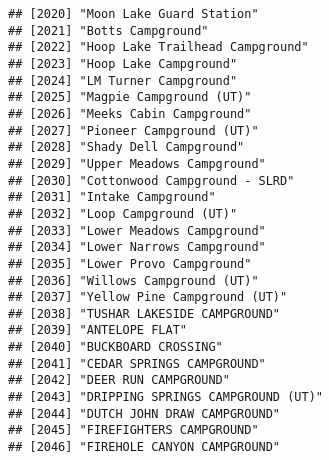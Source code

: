 \documentclass[
]{article}
\begin{document}
\begin{verbatim}
## [2020] "Moon Lake Guard Station"                                                             
## [2021] "Botts Campground"                                                                    
## [2022] "Hoop Lake Trailhead Campground"                                                      
## [2023] "Hoop Lake Campground"                                                                
## [2024] "LM Turner Campground"                                                                
## [2025] "Magpie Campground (UT)"                                                              
## [2026] "Meeks Cabin Campground"                                                              
## [2027] "Pioneer Campground (UT)"                                                             
## [2028] "Shady Dell Campground"                                                               
## [2029] "Upper Meadows Campground"                                                            
## [2030] "Cottonwood Campground - SLRD"                                                        
## [2031] "Intake Campground"                                                                   
## [2032] "Loop Campground (UT)"                                                                
## [2033] "Lower Meadows Campground"                                                            
## [2034] "Lower Narrows Campground"                                                            
## [2035] "Lower Provo Campground"                                                              
## [2036] "Willows Campground (UT)"                                                             
## [2037] "Yellow Pine Campground (UT)"                                                         
## [2038] "TUSHAR LAKESIDE CAMPGROUND"                                                          
## [2039] "ANTELOPE FLAT"                                                                       
## [2040] "BUCKBOARD CROSSING"                                                                  
## [2041] "CEDAR SPRINGS CAMPGROUND"                                                            
## [2042] "DEER RUN CAMPGROUND"                                                                 
## [2043] "DRIPPING SPRINGS CAMPGROUND (UT)"                                                    
## [2044] "DUTCH JOHN DRAW CAMPGROUND"                                                          
## [2045] "FIREFIGHTERS CAMPGROUND"                                                             
## [2046] "FIREHOLE CANYON CAMPGROUND"                                                          

\end{verbatim}
\end{document}
